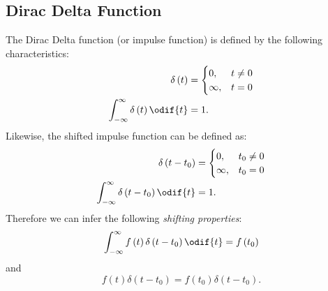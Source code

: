 \documentclass{article}
\begin{document}
\subsection{Dirac Delta Function}
The Dirac Delta function (or impulse function) is defined by the following characteristics:
\begin{align*}
    \delta\left( t \right)                                & = \begin{cases}
                                                                  0,      & t \neq 0 \\
                                                                  \infty, & t = 0
                                                              \end{cases} \\
    \int_{-\infty}^\infty \delta\left( t \right) \odif{t} & = 1.
\end{align*}
Likewise, the shifted impulse function can be defined as:
\begin{align*}
    \delta\left( t - t_0 \right)                                & = \begin{cases}
                                                                        0,      & t_0 \neq 0 \\
                                                                        \infty, & t_0 = 0
                                                                    \end{cases} \\
    \int_{-\infty}^\infty \delta\left( t - t_0 \right) \odif{t} & = 1.
\end{align*}
Therefore we can infer the following \textit{shifting properties}:
\begin{equation*}
    \int_{-\infty}^\infty f\left( t \right) \delta\left( t - t_0 \right) \odif{t} = f\left( t_0 \right)
\end{equation*}
and 
\begin{equation*}
    f\left( t \right) \delta\left( t - t_0 \right) = f\left( t_0 \right) \delta\left( t - t_0 \right).
\end{equation*}
\end{document}

